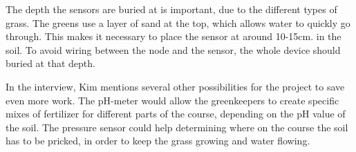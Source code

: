 The depth the sensors are buried at is important, due to the different types of grass. The greens use a layer of sand at the top, which allows water to quickly go through. This makes it necessary to place the sensor at around 10-15cm. in the soil. To avoid wiring between the node and the sensor, the whole device should buried at that depth.

In the interview, Kim mentions several other possibilities for the project to save even more work. The pH-meter would allow the greenkeepers to create specific mixes of fertilizer for different parts of the course, depending on the pH value of the soil. The pressure sensor could help determining where on the course the soil has to be pricked, in order to keep the grass growing and water flowing.